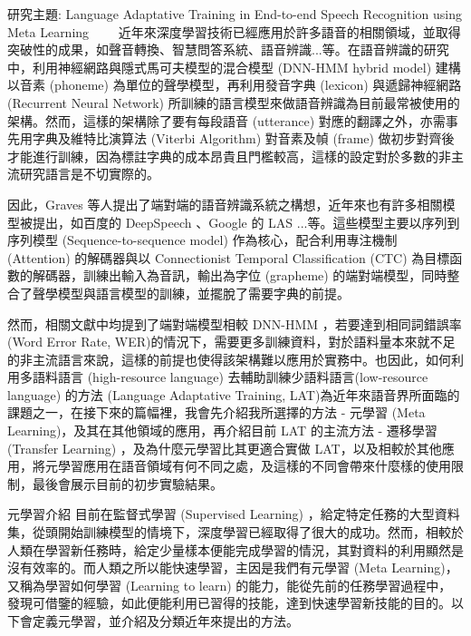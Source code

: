 \documentclass[12pt]{extarticle}
\begin{document}
\begin{section}{研究主題: Language Adaptative Training in End-to-end Speech Recognition using Meta Learning}
~~~~近年來深度學習技術已經應用於許多語音的相關領域，並取得突破性的成果，如聲音轉換、智慧問答系統、語音辨識...等。在語音辨識的研究中，利用神經網路與隱式馬可夫模型的混合模型 (DNN-HMM hybrid model) 建構以音素 (phoneme) 為單位的聲學模型，再利用發音字典 (lexicon) 與遞歸神經網路 (Recurrent Neural Network) 所訓練的語言模型來做語音辨識為目前最常被使用的架構。然而，這樣的架構除了要有每段語音 (utterance) 對應的翻譯之外，亦需事先用字典及維特比演算法 (Viterbi Algorithm) 對音素及幀 (frame) 做初步對齊後才能進行訓練，因為標註字典的成本昂貴且門檻較高，這樣的設定對於多數的非主流研究語言是不切實際的。

  因此，Graves 等人提出了端對端的語音辨識系統之構想\cite{graves2014towards}，近年來也有許多相關模型被提出，如百度的 DeepSpeech \cite{hannun2014deep}、Google 的 LAS \cite{chan2016listen}...等。這些模型主要以序列到序列模型 (Sequence-to-sequence model) 作為核心，配合利用專注機制 (Attention) 的解碼器與以 Connectionist Temporal Classification (CTC) 為目標函數的解碼器，訓練出輸入為音訊，輸出為字位 (grapheme) 的端對端模型，同時整合了聲學模型與語言模型的訓練，並擺脫了需要字典的前提。

  然而，相關文獻中均提到了端對端模型相較 DNN-HMM ，若要達到相同詞錯誤率 (Word Error Rate, WER)的情況下，需要更多訓練資料，對於語料量本來就不足的非主流語言來說，這樣的前提也使得該架構難以應用於實務中。也因此，如何利用多語料語言 (high-resource language) 去輔助訓練少語料語言(low-resource language) 的方法 (Language Adaptative Training, LAT)為近年來語音界所面臨的課題之一，在接下來的篇幅裡，我會先介紹我所選擇的方法 - 元學習 (Meta Learning)，及其在其他領域的應用，再介紹目前 LAT 的主流方法 - 遷移學習 (Transfer Learning) ，及為什麼元學習比其更適合實做 LAT，以及相較於其他應用，將元學習應用在語音領域有何不同之處，及這樣的不同會帶來什麼樣的使用限制，最後會展示目前的初步實驗結果。


  \begin{subsection}{元學習介紹}
    目前在監督式學習 (Supervised Learning) ，給定特定任務的大型資料集，從頭開始訓練模型的情境下，深度學習已經取得了很大的成功。然而，相較於人類在學習新任務時，給定少量樣本便能完成學習的情況，其對資料的利用顯然是沒有效率的。而人類之所以能快速學習，主因是我們有元學習 (Meta Learning)，又稱為學習如何學習 (Learning to learn) 的能力，能從先前的任務學習過程中，發現可借鑒的經驗，如此便能利用已習得的技能，達到快速學習新技能的目的。以下會定義元學習，並介紹及分類近年來提出的方法。


\end{subsection}
\end{section}
\end{document}
